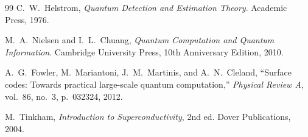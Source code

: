 \documentclass[11pt,a4paper]{article}
\begin{document}
\begin{thebibliography}{99}
C.~W.~Helstrom, \textit{Quantum Detection and Estimation Theory}. Academic Press, 1976.

M.~A.~Nielsen and I.~L.~Chuang, \textit{Quantum Computation and Quantum Information}. Cambridge University Press, 10th Anniversary Edition, 2010.

A.~G.~Fowler, M.~Mariantoni, J.~M.~Martinis, and A.~N.~Cleland, ``Surface codes: Towards practical large-scale quantum computation,'' \textit{Physical Review A}, vol.~86, no.~3, p.~032324, 2012.

M.~Tinkham, \textit{Introduction to Superconductivity}, 2nd ed. Dover Publications, 2004.

\end{thebibliography}
\end{document}
